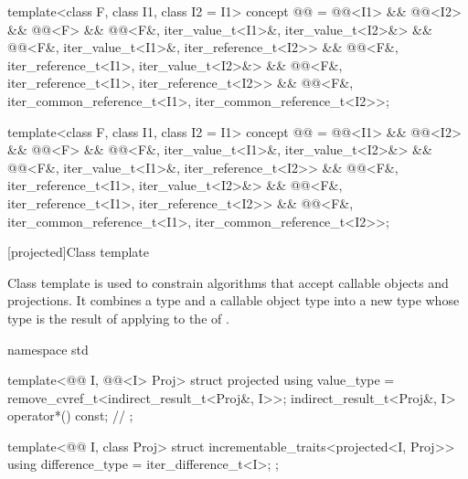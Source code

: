 \begin{codeblock}
{  template<class F, class I1, class I2 = I1>
    concept @@ =
      @@<I1> && @@<I2> &&
      @@<F> &&
      @@<F&, iter_value_t<I1>&, iter_value_t<I2>&> &&
      @@<F&, iter_value_t<I1>&, iter_reference_t<I2>> &&
      @@<F&, iter_reference_t<I1>, iter_value_t<I2>&> &&
      @@<F&, iter_reference_t<I1>, iter_reference_t<I2>> &&
      @@<F&, iter_common_reference_t<I1>, iter_common_reference_t<I2>>;

  template<class F, class I1, class I2 = I1>
    concept @@ =
      @@<I1> && @@<I2> &&
      @@<F> &&
      @@<F&, iter_value_t<I1>&, iter_value_t<I2>&> &&
      @@<F&, iter_value_t<I1>&, iter_reference_t<I2>> &&
      @@<F&, iter_reference_t<I1>, iter_value_t<I2>&> &&
      @@<F&, iter_reference_t<I1>, iter_reference_t<I2>> &&
      @@<F&, iter_common_reference_t<I1>, iter_common_reference_t<I2>>;
}
\end{codeblock}

[projected]{Class template }

\pnum
Class template  is used to constrain algorithms
that accept callable objects and projections.
It combines a  type  and
a callable object type  into a new  type
whose  type is the result of applying
 to the  of .

%
\begin{codeblock}
namespace std {
  template<@@ I, @@<I> Proj>
  struct projected {
    using value_type = remove_cvref_t<indirect_result_t<Proj&, I>>;
    indirect_result_t<Proj&, I> operator*() const;              // \notdef
  };

  template<@@ I, class Proj>
  struct incrementable_traits<projected<I, Proj>> {
    using difference_type = iter_difference_t<I>;
  };
}
\end{codeblock}

